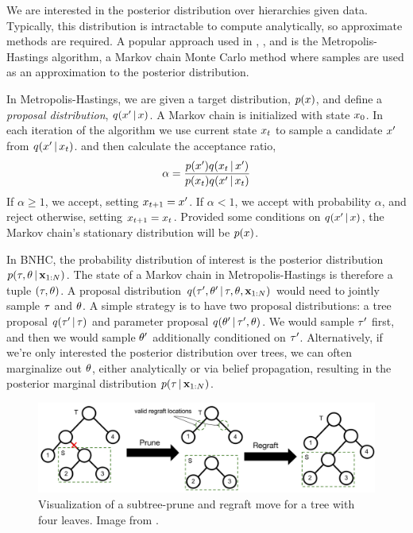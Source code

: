 We are interested
in the posterior distribution
over hierarchies given data.
Typically, this distribution
is intractable to compute
analytically, so approximate
methods are required.
A popular approach used
in \citet{Neal2003}, \citet{Knowles2015}, and \citet{Boyles2012}
is the Metropolis-Hastings
algorithm,
a Markov chain Monte Carlo
method where samples
are used as an approximation
to the posterior distribution.

In Metropolis-Hastings,
we are given a target
distribution, $p(x)$, and
define a \emph{proposal distribution}, $q(x^\prime \,|\, x)$.
A Markov chain is initialized with state $x_0$.
In each iteration of the algorithm
we use current state $x_t$
to sample a candidate $x^\prime$ from $q(x^\prime \,|\, x_t)$.
and then calculate
the acceptance ratio, 
\begin{align}
    \alpha = \frac{p(x^\prime)q(x_t \,|\, x^\prime)}{p(x_t)q(x^\prime \,|\, x_t)}
\end{align}
If $\alpha \ge 1$, we accept,
setting $x_{t + 1} = x^\prime$.
If $\alpha < 1$, we accept
with probability $\alpha$, and reject
otherwise, setting $x_{t + 1} = x_t$.
Provided some conditions on $q(x^\prime \,|\, x)$,
the Markov chain's stationary distribution
will be $p(x)$.

In BNHC, the probability distribution
of interest
is the posterior distribution $p(\tau, \theta \,|\, \mathbf{x}_{1:N})$.
The state of a Markov chain in Metropolis-Hastings is therefore
a tuple $(\tau, \theta)$.
A proposal distribution $q(\tau^\prime, \theta^\prime \,|\, \tau, \theta, \mathbf{x}_{1:N})$ would need to jointly
sample $\tau$ and $\theta$.
A simple strategy is to have two proposal distributions: a 
tree proposal $q(\tau^\prime \,|\, \tau)$
and parameter proposal $q(\theta^\prime \,|\, \tau^\prime, \theta)$. 
We would sample $\tau^\prime$ first,
and then we would sample $\theta^\prime$ 
additionally conditioned on $\tau^\prime$.
Alternatively, if we're only interested
the posterior distribution over trees,
we can often marginalize out $\theta$, either
analytically or via belief propagation,
resulting in the posterior marginal
distribution $p(\tau \,|\, \mathbf{x}_{1:N})$.

\begin{figure}[t]
  \includegraphics[width=\textwidth]{img/trees/spr}
  \caption{Visualization of a subtree-prune and regraft move for a
  tree with four leaves. Image from \citet{Vikram2016}.}
\label{fig:spr}
\end{figure}

